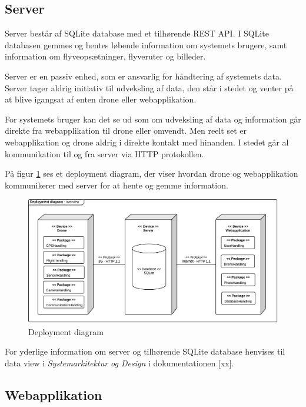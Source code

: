 \newpage 

\subsection{Server}

Server består af SQLite database med et tilhørende REST API. I SQLite databasen gemmes og hentes løbende information om systemets brugere, samt information om flyveopsætninger, flyveruter og billeder.  

Server er en passiv enhed, som er ansvarlig for håndtering af systemets data. Server tager aldrig initiativ til udveksling af data, den står i stedet og venter på at blive igangsat af enten drone eller webapplikation.

For systemets bruger kan det se ud som om udveksling af data og information går direkte fra webapplikation til drone eller omvendt. Men reelt set er webapplikation og drone aldrig i direkte kontakt med hinanden. I stedet går al kommunikation til og fra server via HTTP protokollen. 

På figur \ref{fig:deployment_diagram} ses et deployment diagram, der viser hvordan drone og webapplikation kommunikerer med server for at hente og gemme information.

\begin{figure}[H]
\centering
\includegraphics[width=1\textwidth]{Billeder/deployment_overview.png}
\vspace{-0.5cm}
\caption{Deployment diagram}
\label{fig:deployment_diagram}
\end{figure}
 
For yderlige information om server og tilhørende SQLite database henvises til data view i \textit{Systemarkitektur og Design} i dokumentationen [xx].

\newpage


\subsection{Webapplikation}

